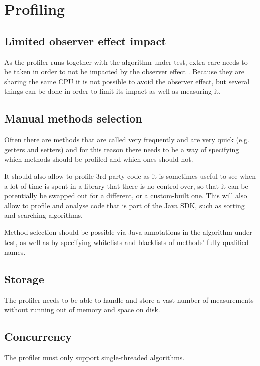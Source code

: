 \section{Profiling}
\label{sec:requirementanalysis:profiling}

\subsection{Limited observer effect impact}
As the profiler runs together with the algorithm under test, extra care needs to be taken in order to not be impacted by the observer effect \cite{MSH08}. Because they are sharing the same CPU it is not possible to avoid the observer effect, but several things can be done in order to limit its impact as well as measuring it.

\subsection{Manual methods selection}
Often there are methods that are called very frequently and are very quick (e.g. getters and setters) and for this reason there needs to be a way of specifying which methods should be profiled and which ones should not.

\noindent It should also allow to profile 3rd party code as it is sometimes useful to see when a lot of time is spent in a library that there is no control over, so that it can be potentially be swapped out for a different, or a custom-built one. This will also allow to profile and analyse code that is part of the Java SDK, such as sorting and searching algorithms.

\noindent Method selection should be possible via Java annotations in the algorithm under test, as well as by specifying whitelists and blacklists of methods' fully qualified names.

\subsection{Storage}
The profiler needs to be able to handle and store a vast number of measurements without running out of memory and space on disk.

\subsection{Concurrency}
\label{sec:requirementanalysis:profiling:concurrency}
The profiler must only support single-threaded algorithms.

